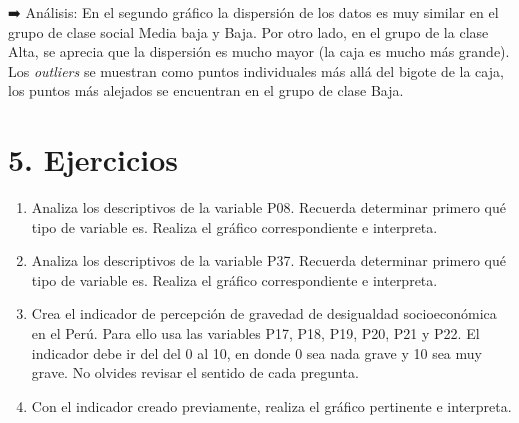 \documentclass[
]{article}
\begin{document}
➡️ Análisis: En el segundo gráfico la dispersión de los datos es muy
similar en el grupo de clase social Media baja y Baja. Por otro lado, en
el grupo de la clase Alta, se aprecia que la dispersión es mucho mayor
(la caja es mucho más grande). Los \emph{outliers} se muestran como
puntos individuales más allá del bigote de la caja, los puntos más
alejados se encuentran en el grupo de clase Baja.

\hypertarget{ejercicios}{%
\section{\texorpdfstring{\textbf{5.
Ejercicios}}{5. Ejercicios}}\label{ejercicios}}

\begin{enumerate}
\def\labelenumi{\arabic{enumi}.}
\item
  Analiza los descriptivos de la variable P08. Recuerda determinar
  primero qué tipo de variable es. Realiza el gráfico correspondiente e
  interpreta.
\item
  Analiza los descriptivos de la variable P37. Recuerda determinar
  primero qué tipo de variable es. Realiza el gráfico correspondiente e
  interpreta.
\item
  Crea el indicador de percepción de gravedad de desigualdad
  socioeconómica en el Perú. Para ello usa las variables P17, P18, P19,
  P20, P21 y P22. El indicador debe ir del del 0 al 10, en donde 0 sea
  nada grave y 10 sea muy grave. No olvides revisar el sentido de cada
  pregunta.
\item
  Con el indicador creado previamente, realiza el gráfico pertinente e
  interpreta.
\end{enumerate}
\end{document}
